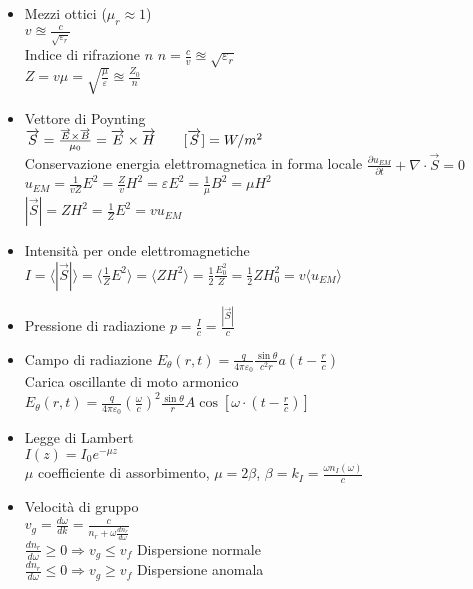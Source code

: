 \documentclass[a4paper]{article}
\begin{document}
\begin{itemize}
\item Mezzi ottici ($\mu_r \approx 1$)\\
$v \approxeq \frac{c}{\sqrt{\varepsilon_r}}$\\
Indice di rifrazione $n$ \hspace{5mm} $n=\frac{c}{v}\approxeq \sqrt{\varepsilon_r} $\\
$Z=v \mu = \sqrt{\frac{\mu}{\varepsilon}}\approxeq \frac{Z_0}{n}$
\item Vettore di Poynting\\
$\overrightarrow{S}=\frac{\overrightarrow{E} \times \overrightarrow{B}}{\mu_0}=\overrightarrow{E} \times \overrightarrow{H}\hspace{7mm} [\overrightarrow{S}]=W/m^2$\\
Conservazione energia elettromagnetica in forma locale\hspace{5mm} $\frac{\partial u_{EM}}{\partial t}+\nabla \cdot \overrightarrow{S}=0$\\
$u_{EM}=\frac{1}{vZ}E^2=\frac{Z}{v}H^2=\varepsilon E^2 = \frac{1}{\mu}B^2=\mu H^2$\\
$|\overrightarrow{S}|=ZH^2=\frac{1}{Z}E^2=v u_{EM}$
\item Intensità per onde elettromagnetiche\\
$I=\langle |\overrightarrow{S}|\rangle =\langle \frac{1}{Z} E^2 \rangle = \langle Z H^2\rangle =\frac{1}{2}\frac{E_0^2}{Z}=\frac{1}{2}ZH_0^2=v\langle u_{EM}\rangle$
\item Pressione di radiazione
$p=\frac{I}{c}=\frac{|\overrightarrow{S}|}{c}$
\item Campo di radiazione
$E_\theta(r,t)=\frac{q}{4 \pi \varepsilon_0}\frac{\sin \theta}{c^2 r} a (t-\frac{r}{c})$\\
Carica oscillante di moto armonico\\
$E_\theta(r,t)=\frac{q}{4 \pi \varepsilon_0}(\frac{\omega}{c})^2 \frac{\sin \theta}{r} A \cos[ \omega \cdot(t-\frac{r}{c})]$
\item Legge di Lambert\\
$I(z)=I_0 e^{-\mu z}$\\
$\mu$ coefficiente di assorbimento, $\mu=2\beta$, $\beta=k_I=\frac{\omega n_I(\omega)}{c}$
\item Velocità di gruppo\\
$v_g=\frac{d \omega}{dk}=\frac{c}{n_r+\omega \frac{dn_r}{d\omega}}$\\
$\frac{dn_r}{d\omega}\geq 0\Rightarrow v_g \leq v_f$ Dispersione normale\\
$\frac{dn_r}{d\omega}\leq 0\Rightarrow v_g \geq v_f$ Dispersione anomala

\end{itemize}
\end{document}
